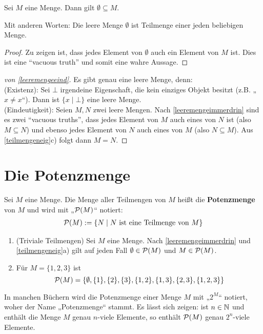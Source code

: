 \begin{satz} \label{leeremengeimmerdrin}
    Sei $M$ eine Menge. Dann gilt $\emptyset\subseteq M$.

    Mit anderen Worten: Die leere Menge $\emptyset$ ist Teilmenge einer jeden beliebigen Menge.
\end{satz}
\begin{proof}
    Zu zeigen ist, dass jedes Element von $\emptyset$ auch ein Element von $M$ ist. Dies ist eine ``vacuous truth'' und somit eine wahre Aussage.
\end{proof}


\begin{proof}[von \cref{leeremengeeind}] \label{bew:leeremengeeind}
    Es gibt genau eine leere Menge, denn: \\[0.5em]
    (Existenz): Sei $\bot$ irgendeine Eigenschaft, die kein einziges Objekt besitzt (z.B. „$x\neq x$“). Dann ist $\{ x\mid \bot \}$ eine leere Menge. \\[0.5em]
    (Eindeutigkeit): Seien $M,N$ zwei leere Mengen. Nach \cref{leeremengeimmerdrin} sind es zwei ``vacuous truths'', dass jedes Element von $M$ auch eines von $N$ ist (also $M\subseteq N$) und ebenso jedes Element von $N$ auch eines von $M$ (also $N\subseteq M$). Aus \cref{teilmengeneig}c) folgt dann $M=N$.
\end{proof}





\section{Die Potenzmenge}


\begin{defin}[Potenzmenge] \label{def:potenzmenge} 
    Sei $M$ eine Menge. Die Menge aller Teilmengen von $M$ heißt die \textbf{Potenzmenge} von $M$ und wird mit „$\mathcal P(M)$“ notiert:
    \begin{align*}
        \mathcal P(M) := \{N \mid N \ \text{ist eine Teilmenge von $M$} \}
    \end{align*}
\end{defin}


\begin{bsp} \label{bsp:potenzmenge} \quad
    \begin{enumerate}
        \item(Triviale Teilmengen) Sei $M$ eine Menge. Nach \cref{leeremengeimmerdrin} und \cref{teilmengeneig}a) gilt auf jeden Fall $\emptyset\in \mathcal P(M)$ und $M\in \mathcal P(M)$.
        \item Für $M=\{1,2,3\}$ ist
            \[ \mathcal P(M)=\left\{\emptyset,\{1\},\{2\},\{3\},\{1,2\},\{1,3\},\{2,3\},\{1,2,3\}\right\} \]
    \end{enumerate}
    In manchen Büchern wird die Potenzmenge einer Menge $M$ mit „$2^M$“ notiert, woher der Name „Potenzmenge“ stammt. Es lässt sich zeigen: ist $n\in \mathbb N$ und enthält die Menge $M$ genau $n$-viele Elemente, so enthält $\mathcal P(M)$ genau $2^n$-viele Elemente.
\end{bsp}


